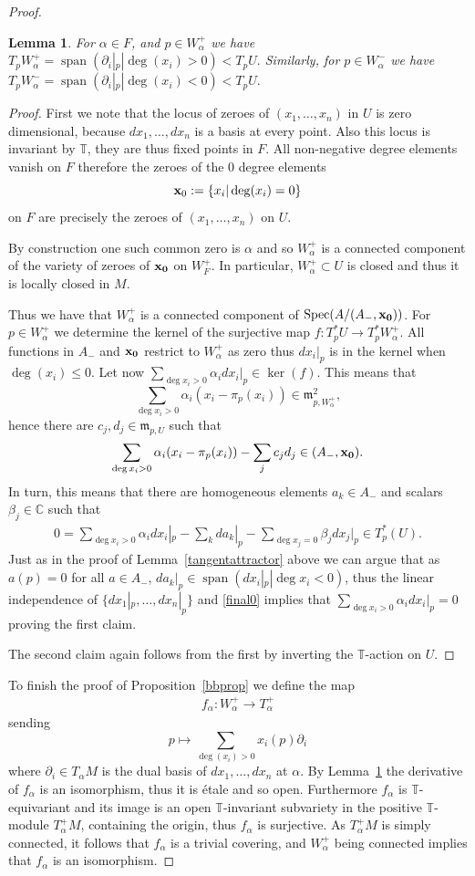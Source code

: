 \documentclass[12pt]{article}
\numberwithin{equation}{section}
\newtheorem{lemma}[theorem]{Lemma}
\theoremstyle{remark}
\theoremstyle{definition}
\numberwithin{theorem}{section}
\def\beq{\begin{eqnarray}}
\def\eeq{\end{eqnarray}}
\DeclareMathOperator{\Spec}{Spec}
\def\C{\mathbb{C}}
\newcommand{\T}{{\mathbb{T}}}
\def\m{{\mathfrak m}}
\renewcommand{\1}{\mathbbm{1}}
\begin{document}
\begin{proof}
	\begin{lemma} \label{tangentup} For $\alpha\in F$, and $p\in W^+_\alpha$  we have  $T_p W^+_{\alpha}=\operatorname{span}(\partial_i|_p|\deg(x_i)> 0)<T_pU.$ Similarly,  for $p\in W^-_\alpha$  we have  $T_p W^-_{\alpha}=\operatorname{span}(\partial_i|_p|\deg(x_i)< 0)<T_pU.$
	\end{lemma}
	
	\begin{proof} First we note that the locus of zeroes of $(x_1,\dots,x_n)$ in $U$ is zero dimensional, because $dx_1,\dots,dx_n$ is a basis at every point. Also this locus is invariant by $\T$, they are thus fixed points in $F$. All non-negative degree elements vanish on $F$ therefore the zeroes of the $0$ degree elements $${\bf x}_0:=\{x_i|\deg(x_i)=0\}$$ on $F$ are precisely the zeroes of $(x_1,\dots,x_n)$ on $U$. 
		
		By construction one such common zero is $\alpha$ and so $W^+_\alpha$ is a connected component of the variety of zeroes of $\bf{x}_0$ on $W^+_{F}$. In particular, $W^+_\alpha\subset U$ is closed and thus it is locally closed in $M$. 
		
		Thus we have that  $W^+_\alpha$ is a connected component of $\Spec(A/(A_-,\bf{x}_0))$. For $p\in W^+_\alpha$ we determine the kernel of the surjective map $f:T^*_p U\to T^*_p W^+_\alpha$. All functions in $A_-$ and  $\bf{x}_0$ restrict to $W^+_\alpha$ as zero thus $dx_i|_p$ is in the kernel when $\deg(x_i)\leq 0$. Let now $\sum_{\deg x_i>0} \alpha_i dx_i|_p \in \ker(f)$. This means that $$\sum_{\deg x_i> 0} \alpha_i (x_i-\pi_p(x_i))\in \m_{p,W^+_\alpha }^2,$$ hence there are $c_j,d_j\in \m_{p,U}$ such that $$\sum_{\deg x_i> 0} \alpha_i (x_i-\pi_p(x_i))-\sum_j c_j d_j\in (A_-,\bf{x}_0).$$ In turn, this means that there are homogeneous elements $a_k\in A_-$  and scalars $\beta_j\in \C$ such that \beq \label{final0} 0=\sum_{\deg x_i>0} \alpha_i dx_i|_p-\sum_k  da_k|_p-\sum_{\deg x_j=0} \beta_j dx_j|_p\in  T^*_p(U).\eeq Just as in the proof of Lemma~\ref{tangentattractor} above we can argue that as $a(p)=0$ for all $a\in A_-$, $da_k|_p\in \operatorname{span}(dx_i|_p|\deg x_i<0)$, thus the linear independence of $\{dx_1|_p,\dots,dx_n|_p\}$ and \eqref{final0} implies that $\sum_{\deg x_i>0} \alpha_i dx_i|_p =0$ proving the first claim.
		
		The second claim again follows from the first by inverting the $\T$-action on $U$.
	\end{proof}
	
	To finish the proof of Proposition~\ref{bbprop} we define the map \beq\label{model}f_\alpha:W^+_\alpha\to T^+_\alpha\eeq sending $$p\mapsto \sum_{\deg(x_i)>0} x_i(p)\partial_i$$ where $\partial_i\in T_\alpha M$ is the dual basis of $dx_1,\dots,dx_n$ at $\alpha$. By Lemma~\ref{tangentup} the derivative of $f_\alpha$  is an isomorphism, thus it is \'etale and so open. Furthermore $f_\alpha$ is $\T$-equivariant and  its image is an open $\T$-invariant subvariety in the positive $\T$-module $T^+_\alpha M$, containing the origin, thus $f_\alpha$ is surjective. As $T^+_\alpha M$ is simply connected, it follows that $f_\alpha$ is a trivial covering, and $W^+_\alpha$ being connected implies that $f_\alpha$ is an isomorphism. 
\end{proof}
\end{document}
